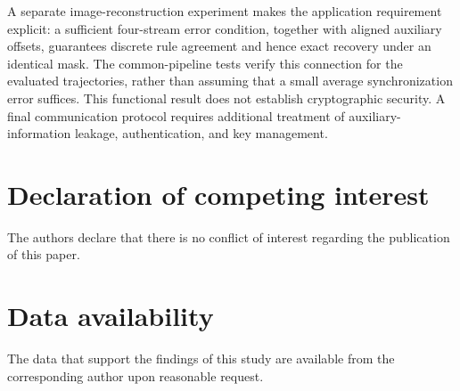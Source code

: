 \documentclass[a4paper,fleqn]{cas-dc}
\theoremstyle{plain}
\theoremstyle{definition}
\begin{document}
A separate image-reconstruction experiment makes the application requirement explicit: a sufficient four-stream error condition, together with aligned auxiliary offsets, guarantees discrete rule agreement and hence exact recovery under an identical mask. The common-pipeline tests verify this connection for the evaluated trajectories, rather than assuming that a small average synchronization error suffices. This functional result does not establish cryptographic security. A final communication protocol requires additional treatment of auxiliary-information leakage, authentication, and key management.

\section*{Declaration of competing interest}
The authors declare that there is no conflict of interest regarding the publication of this paper.

%

\section*{Data availability}
The data that support the findings of this study are available from the corresponding author upon reasonable request.

%

%
%


\end{document}
